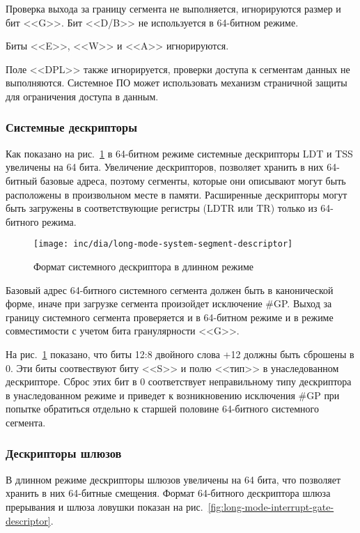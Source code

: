 Проверка выхода за границу сегмента не выполняется, игнорируются размер и бит <<G>>. Бит <<D/B>> не
используется в 64-битном режиме.

Биты <<E>>, <<W>> и <<A>> игнорируются.

Поле <<DPL>> также игнорируется, проверки доступа к сегментам данных не выполняются.
Системное ПО может использовать механизм страничной защиты для ограничения доступа в данным.

\subsubsection*{Системные дескрипторы}
\label{subsec:system_desriptor_format}

Как показано на рис.~\ref{fig:long-mode-system-segment-descriptor-format} в 64-битном режиме
системные дескрипторы LDT и TSS увеличены на 64 бита. Увеличение дескрипторов, позволяет
хранить в них 64-битный базовые адреса, поэтому сегменты, которые они описывают могут быть
расположены в произвольном месте в памяти. Расширенные дескрипторы могут быть загружены в
соответствующие регистры (LDTR или TR) только из 64-битного режима.

\begin{figure}[ht!]
  \centering
  \texttt{[image: inc/dia/long-mode-system-segment-descriptor]}
  \caption{Формат системного дескриптора в длинном режиме}
  \label{fig:long-mode-system-segment-descriptor-format}
\end{figure}

Базовый адрес 64-битного системного сегмента должен быть в канонической форме, иначе при
загрузке сегмента произойдет исключение \#GP. Выход за границу системного сегмента проверяется и
в 64-битном режиме и в режиме совместимости с учетом бита гранулярности <<G>>.

На рис.~\ref{fig:long-mode-system-segment-descriptor-format} показано, что биты 12:8 двойного слова +12
должны быть сброшены в 0. Эти биты соотвествуют биту <<S>> и полю <<тип>> в унаследованном дескрипторе.
Сброс этих бит в 0 соответствует неправильному типу дескриптора в унаследованном режиме и приведет
к возникновению исключения \#GP при попытке обратиться отдельно к старшей половине 64-битного системного сегмента.

\subsubsection*{Дескрипторы шлюзов}
В длинном режиме дескрипторы шлюзов увеличены на 64 бита, что позволяет хранить в них 64-битные смещения.
Формат 64-битного дескриптора шлюза прерывания и шлюза ловушки показан на рис.~\ref{fig:long-mode-interrupt-gate-descriptor}.

